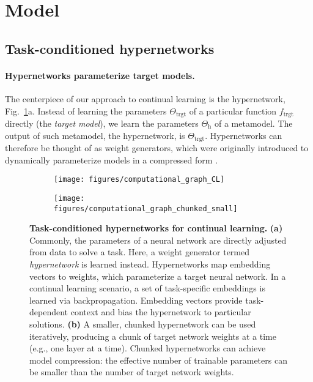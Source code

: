 \documentclass{article}
\begin{document}
\section{Model}

\subsection{Task-conditioned hypernetworks}

\paragraph{Hypernetworks parameterize target models.} The centerpiece of our approach to continual learning is the hypernetwork, Fig.~\ref{fig:hypernets}a. Instead of learning the parameters $\Theta_\text{trgt}$ of a particular function $f_\text{trgt}$ directly (the \emph{target model}), we learn the parameters $\Theta_\text{h}$ of a metamodel. The output of such metamodel, the hypernetwork, is $\Theta_\text{trgt}$. Hypernetworks can therefore be thought of as weight generators, which were originally introduced to dynamically parameterize models in a compressed form \citep{ha_hypernetworks_2017,schmidhuber1992learning,bertinetto_learning_2016,jia_dynamic_2016}.


\begin{figure}[htbp]
    \begin{subfigure}{0.63\linewidth}
    \caption{\vspace{-0.15cm}}
    \texttt{[image: figures/computational\_graph\_CL]}
    \end{subfigure}
    \begin{subfigure}{0.35\linewidth}
    \caption{\vspace{-0.15cm}}
    \texttt{[image: figures/computational\_graph\_chunked\_small]}
    \end{subfigure}

  \caption{\textbf{Task-conditioned hypernetworks for continual learning.} \textbf{(a)} Commonly, the parameters of a neural network are directly adjusted from data to solve a task. Here, a weight generator termed \emph {hypernetwork} is learned instead. Hypernetworks map embedding vectors to weights, which parameterize a target neural network. In a continual learning scenario, a set of task-specific embeddings is learned via backpropagation. Embedding vectors provide task-dependent context and bias the hypernetwork to particular solutions. \textbf{(b)} A smaller, chunked hypernetwork can be used iteratively, producing a chunk of target network weights at a time (e.g., one layer at a time). Chunked hypernetworks can achieve model compression: the effective number of trainable parameters can be smaller than the number of target network weights. \label{fig:hypernets}}
\end{figure}
\end{document}
